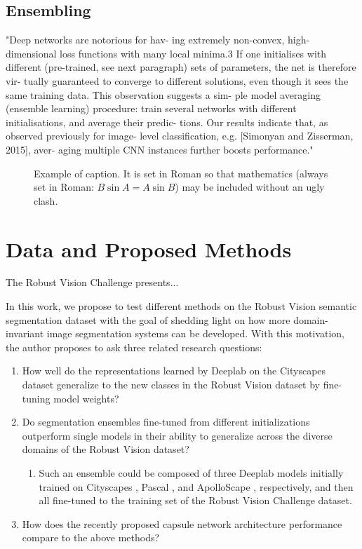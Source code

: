 \documentclass[10pt,twocolumn,letterpaper]{article}
\begin{document}
\subsection{Ensembling}
"Deep networks are notorious for hav- ing extremely non-convex, high-dimensional loss functions with many local minima.3 If one initialises with different (pre-trained, see next paragraph) sets of parameters, the net is therefore vir- tually guaranteed to converge to different solutions, even though it sees the same training data. This observation suggests a sim- ple model averaging (ensemble learning) procedure: train several networks with different initialisations, and average their predic- tions. Our results indicate that, as observed previously for image- level classification, e.g. [Simonyan and Zisserman, 2015], aver- aging multiple CNN instances further boosts performance." \cite{marmanis2016semantic}


\begin{figure}[t]
\begin{center}
\fbox{\rule{0pt}{2in} \rule{0.9\linewidth}{0pt}}
\end{center}
   \caption{Example of caption.  It is set in Roman so that mathematics
   (always set in Roman: $B \sin A = A \sin B$) may be included without an
   ugly clash.}
\label{fig:long}
\label{fig:onecol}
\end{figure}

\section{Data and Proposed Methods}
The Robust Vision Challenge presents...

In this work, we propose to test different methods on the Robust Vision semantic segmentation dataset with the goal of shedding light on how more domain-invariant
image segmentation systems can be developed. With this motivation, the author proposes to ask three related research questions:
\begin{enumerate}
\item How well do the representations learned by Deeplab on the Cityscapes dataset generalize to the new classes in the Robust Vision dataset by fine-tuning model weights?
\item Do segmentation ensembles fine-tuned from different initializations outperform single models in their ability to generalize across the diverse domains of the Robust Vision dataset?
\begin{enumerate}
  \item Such an ensemble could be composed of three Deeplab models initially trained on Cityscapes \cite{cordts2016cityscapes}, Pascal \cite{everingham2010pascal}, and ApolloScape \cite{huang2018apolloscape}, respectively, and then all
  fine-tuned to the training set of the Robust Vision Challenge dataset.
\end{enumerate}
\item How does the recently proposed capsule network architecture \cite{sabour2017dynamic} performance compare to the above methods?
\end{enumerate}
\end{document}
